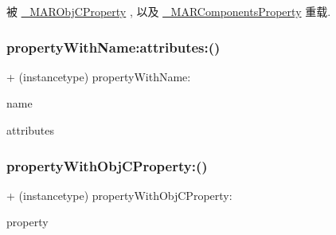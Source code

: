 被 \hyperlink{interface___m_a_r_obj_c_property_aac68d2ed082bee7893ff90cd2a9e38d6}{\+\_\+\+M\+A\+R\+Obj\+C\+Property} , 以及 \hyperlink{interface___m_a_r_components_property_a4825e59c276f417da313ea24d4d5d312}{\+\_\+\+M\+A\+R\+Components\+Property} 重载.

\mbox{\label{interface_m_a_r_property_a4bc8b22d1498d6544428c0b12ba8ad52}} 
\subsubsection{\texorpdfstring{property\+With\+Name\+:attributes\+:()}{propertyWithName:attributes:()}}
{\footnotesize\ttfamily + (instancetype) property\+With\+Name\+: \begin{DoxyParamCaption}\item[{(N\+S\+String $\ast$)}]{name }\item[{attributes:(N\+S\+Dictionary $\ast$)}]{attributes }\end{DoxyParamCaption}}

\mbox{\label{interface_m_a_r_property_ad9ec091c853566446e7080749db2a599}} 
\subsubsection{\texorpdfstring{property\+With\+Obj\+C\+Property\+:()}{propertyWithObjCProperty:()}}
{\footnotesize\ttfamily + (instancetype) property\+With\+Obj\+C\+Property\+: \begin{DoxyParamCaption}\item[{(objc\+\_\+property\+\_\+t)}]{property }\end{DoxyParamCaption}}

\mbox{\label{interface_m_a_r_property_aac61fef11e5a4e2d14a8bb517ba53666}} 

